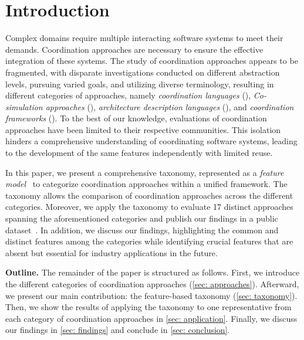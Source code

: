 \documentclass[runningheads]{llncs}
\begin{document}
\section{Introduction} \label{sec: introduction}
Complex domains require multiple interacting software systems to meet their demands. 
Coordination approaches are necessary to ensure the effective integration of these systems.
The study of coordination approaches appears to be fragmented, with disparate investigations conducted on different abstraction levels, pursuing varied goals, and utilizing diverse terminology, resulting in different categories of approaches, namely \textit{coordination languages} (\cite{papadopoulosCoordinationModelsLanguages1998}), \textit{Co-simulation approaches} (\cite{gomesCoSimulationSurvey2019}), \textit{architecture description languages} (\cite{clementsSurveyArchitectureDescription1996}), and \textit{coordination frameworks} (\cite{krauterBehavioralConsistencyMultimodeling2023,varalarsenBehavioralCoordinationOperator2015}).
To the best of our knowledge, evaluations of coordination approaches have been limited to their respective communities.
This isolation hinders a comprehensive understanding of coordinating software systems, leading to the development of the same features independently with limited reuse.

In this paper, we present a comprehensive taxonomy, represented as a \textit{feature model}~\cite{kangFeatureOrientedDomainAnalysis1990} to categorize coordination approaches within a unified framework.
The taxonomy allows the comparison of coordination approaches across the different categories.
Moreover, we apply the taxonomy to evaluate 17 distinct approaches spanning the aforementioned categories and publish our findings in a public dataset~\cite{timkrauterArtifactsCoordination2024}.
In addition, we discuss our findings, highlighting the common and distinct features among the categories while identifying crucial features that are absent but essential for industry applications in the future.

\textbf{Outline.} The remainder of the paper is structured as follows.
First, we introduce the different categories of coordination approaches (\autoref{sec: approaches}).
Afterward, we present our main contribution: the feature-based taxonomy (\autoref{sec: taxonomy}).
Then, we show the results of applying the taxonomy to one representative from each category of coordination approaches in \autoref{sec: application}.
Finally, we discuss our findings in \autoref{sec: findings} and conclude in \autoref{sec: conclusion}.
\end{document}
